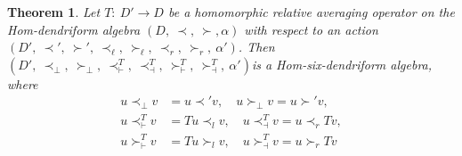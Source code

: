 \documentclass[11pt,twoside,reqno]{amsart}
\theoremstyle{plain}
\newtheorem{thm}{Theorem}[section]
\theoremstyle{definition}
\begin{document}
\begin{thm}
Let $T :\ D' \to D$ be a homomorphic relative averaging operator on the Hom-dendriform algebra $(D  ,\ \prec  ,\ \succ  ,\alpha)$ with respect to an action $(D',\  \prec' ,\ \succ',\  \prec_\ell ,\ \succ_\ell,\  \prec_r ,\ \succ_r ,\ \alpha')$. Then \\$(D',\  \prec_\perp,\  \succ_\perp,\  \prec^T_\vdash,\  \prec^T_\dashv ,\ \succ^T_\vdash ,\ \succ^T_\dashv,\  \alpha')$is a Hom-six-dendriform algebra, where
\begin{align*}
u \prec_\perp v &= u \prec' v ,\quad 
u \succ_\perp v = u \succ' v ,\\ 
u \prec^T_\vdash v &= T u \prec_l v ,\quad
u \prec^T_\dashv v = u \prec_r T v ,\\
u \succ^T_\vdash v &= T u \succ_l v ,\quad 
u \succ^T_\dashv v = u \succ_r T v 
\end{align*}
\end{thm} 
\end{document}
